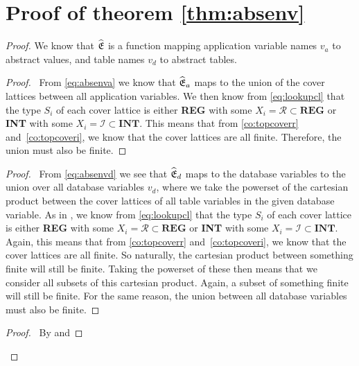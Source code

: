 \section{Proof of theorem \ref{thm:absenv}}

\absenv*

\begin{proof}
   We know that $\widehat{\mathfrak{E}}$ is a function mapping application variable names $v_a$ to abstract values, and table names $v_d$ to abstract tables.
    \begin{proof}
        \pf\ From \autoref{eq:absenva} we know that $\widehat{\mathfrak{E}}_a$ maps to the union of the cover lattices between all application variables.
        We then know from \autoref{eq:lookupcl} that the type $S_i$ of each cover lattice is either \textbf{REG} with some $X_i=\mathcal{R}\subset\textbf{REG}$ or \textbf{INT} with some $X_i=\mathcal{I}\subset\textbf{INT}$.
        This means that from \autoref{co:topcoverr} and~\ref{co:topcoveri}, we know that the cover lattices are all finite.
        Therefore, the union must also be finite.
    \end{proof}
    \begin{proof}
        \pf\ From \autoref{eq:absenvd} we see that $\widehat{\mathfrak{E}}_d$ maps to the database variables to the union over all database variables $v_d$, where we take the powerset of the cartesian product between the cover lattices of all table variables in the given database variable.
        As in , we know from \autoref{eq:lookupcl} that the type $S_i$ of each cover lattice is either \textbf{REG} with some $X_i=\mathcal{R}\subset\textbf{REG}$ or \textbf{INT} with some $X_i=\mathcal{I}\subset\textbf{INT}$.
        Again, this means that from \autoref{co:topcoverr} and~\ref{co:topcoveri}, we know that the cover lattices are all finite.
        So naturally, the cartesian product between something finite will still be finite.
        Taking the powerset of these then means that we consider all subsets of this cartesian product.
        Again, a subset of something finite will still be finite.
        For the same reason, the union between all database variables must also be finite.
    \end{proof}
    \qedstep
    \begin{proof}
        \pf\ By  and 
    \end{proof}
\end{proof}
